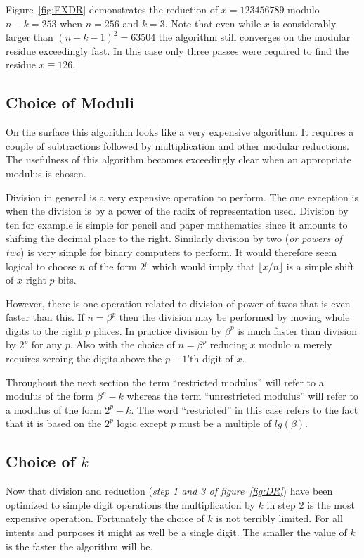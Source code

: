 \documentclass[b5paper]{book}
\begin{document}
Figure~\ref{fig:EXDR} demonstrates the reduction of $x = 123456789$ modulo $n - k = 253$ when $n = 256$ and $k = 3$.  Note that even while $x$
is considerably larger than $(n - k - 1)^2 = 63504$ the algorithm still converges on the modular residue exceedingly fast.  In this case only
three passes were required to find the residue $x \equiv 126$.


\subsection{Choice of Moduli}
On the surface this algorithm looks like a very expensive algorithm.  It requires a couple of subtractions followed by multiplication and other
modular reductions.  The usefulness of this algorithm becomes exceedingly clear when an appropriate modulus is chosen.

Division in general is a very expensive operation to perform.  The one exception is when the division is by a power of the radix of representation used.  
Division by ten for example is simple for pencil and paper mathematics since it amounts to shifting the decimal place to the right.  Similarly division 
by two (\textit{or powers of two}) is very simple for binary computers to perform.  It would therefore seem logical to choose $n$ of the form $2^p$ 
which would imply that $\lfloor x / n \rfloor$ is a simple shift of $x$ right $p$ bits.  

However, there is one operation related to division of power of twos that is even faster than this.  If $n = \beta^p$ then the division may be 
performed by moving whole digits to the right $p$ places.  In practice division by $\beta^p$ is much faster than division by $2^p$ for any $p$.  
Also with the choice of $n = \beta^p$ reducing $x$ modulo $n$ merely requires zeroing the digits above the $p-1$'th digit of $x$.  

Throughout the next section the term ``restricted modulus'' will refer to a modulus of the form $\beta^p - k$ whereas the term ``unrestricted
modulus'' will refer to a modulus of the form $2^p - k$.  The word ``restricted'' in this case refers to the fact that it is based on the 
$2^p$ logic except $p$ must be a multiple of $lg(\beta)$.  

\subsection{Choice of $k$}
Now that division and reduction (\textit{step 1 and 3 of figure~\ref{fig:DR}}) have been optimized to simple digit operations the multiplication by $k$
in step 2 is the most expensive operation.  Fortunately the choice of $k$ is not terribly limited.  For all intents and purposes it might
as well be a single digit.  The smaller the value of $k$ is the faster the algorithm will be.  
\end{document}
